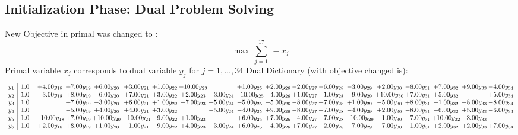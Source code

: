 \documentclass[9pt]{article}
\begin{document}
\subsection{Initialization Phase: Dual Problem Solving}
New Objective in primal was changed to : \[ \max\ \sum_{j=1}^{17}\ - x_j \] 
Primal variable $x_j$ corresponds to dual variable $y_j$ for $j = 1,\ldots,34$
Dual Dictionary (with objective changed is): 
\[\begin{array}{c| c c@{\hskip 2pt} c@{\hskip 2pt} c@{\hskip 2pt} c@{\hskip 2pt} c@{\hskip 2pt} c@{\hskip 2pt} c@{\hskip 2pt} c@{\hskip 2pt} c@{\hskip 2pt} c@{\hskip 2pt} c@{\hskip 2pt} c@{\hskip 2pt} c@{\hskip 2pt} c@{\hskip 2pt} c@{\hskip 2pt} c@{\hskip 2pt} c@{\hskip 2pt} }
 y_{1}   &  1.0 & +  4.00 y_{18} & +  7.00 y_{19} & +  6.00 y_{20} & +  3.00 y_{21} & +  1.00 y_{22} & -10.00 y_{23} &   & +  1.00 y_{25} & +  2.00 y_{26} & -2.00 y_{27} & -6.00 y_{28} & -3.00 y_{29} & +  2.00 y_{30} & -8.00 y_{31} & +  7.00 y_{32} & +  9.00 y_{33} & -4.00 y_{34}\\
 y_{2}   &  1.0 & -3.00 y_{18} & +  8.00 y_{19} & -6.00 y_{20} & +  7.00 y_{21} & +  3.00 y_{22} & +  2.00 y_{23} & +  3.00 y_{24} & + 10.00 y_{25} & -4.00 y_{26} & +  1.00 y_{27} & -1.00 y_{28} & -9.00 y_{29} & + 10.00 y_{30} & +  7.00 y_{31} & +  5.00 y_{32} &   & +  5.00 y_{34}\\
 y_{3}   &  1.0  &   & +  7.00 y_{19} & -3.00 y_{20} & +  6.00 y_{21} & +  1.00 y_{22} & -7.00 y_{23} & +  5.00 y_{24} & -5.00 y_{25} & -5.00 y_{26} & -8.00 y_{27} & +  7.00 y_{28} & +  1.00 y_{29} & -5.00 y_{30} & +  8.00 y_{31} & -1.00 y_{32} & -8.00 y_{33} & -8.00 y_{34}\\
 y_{4}   &  1.0  &   & -5.00 y_{19} & +  4.00 y_{20} & +  4.00 y_{21} & +  3.00 y_{22} &   & -5.00 y_{24} & -4.00 y_{25} & +  9.00 y_{26} & -8.00 y_{27} & +  7.00 y_{28} & -4.00 y_{29} & +  2.00 y_{30} & -8.00 y_{31} & -6.00 y_{32} & +  5.00 y_{33} & -6.00 y_{34}\\
 y_{5}   &  1.0 & -10.00 y_{18} & +  7.00 y_{19} & + 10.00 y_{20} & -10.00 y_{21} & -9.00 y_{22} & +  1.00 y_{23} &   & +  6.00 y_{25} & +  7.00 y_{26} & -4.00 y_{27} & +  7.00 y_{28} & + 10.00 y_{29} & -1.00 y_{30} & -7.00 y_{31} & + 10.00 y_{32} & -3.00 y_{33} &   \\
 y_{6}   &  1.0 & +  2.00 y_{18} & +  8.00 y_{19} & +  1.00 y_{20} & -1.00 y_{21} & -9.00 y_{22} & +  4.00 y_{23} & -3.00 y_{24} & +  6.00 y_{25} & -4.00 y_{26} & +  7.00 y_{27} & +  2.00 y_{28} & -7.00 y_{29} & -7.00 y_{30} & -1.00 y_{31} & +  2.00 y_{32} & +  2.00 y_{33} & +  7.00 y_{34}\\

\end{array}\]
\end{document}
